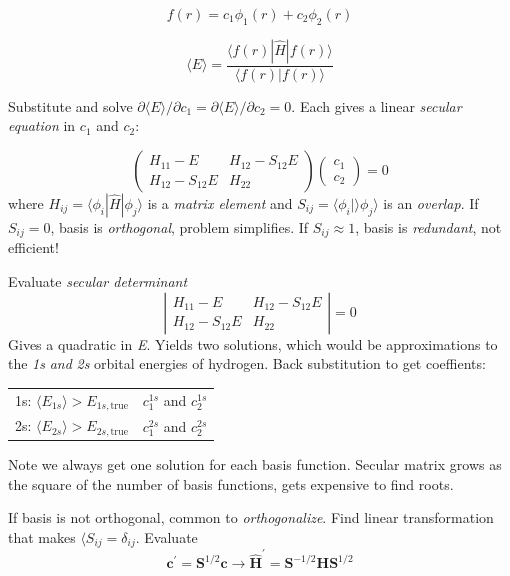 \documentclass[11pt]{article}
\begin{document}
\[f(r) =c_1 \phi_1(r) + c_2\phi_2(r) \]

\[\langle E \rangle = \frac{\langle f(r)|\hat{H}|f(r)\rangle}{\langle f(r)|f(r)\rangle} \]

Substitute and solve \(\partial \langle E \rangle/\partial c_1 = \partial \langle E \rangle/\partial c_2 = 0\).  Each gives a linear \emph{secular equation} in \(c_1\) and \(c_2\):

\[
\left(\begin{array}{cc}
H_{11} - E & H_{12}-S_{12}E \\
H_{12}-S_{12}E & H_{22} 
\end{array}\right)\left(
\begin{array}{c} c_1 \\c_2\end{array}\right) =0
\]
where \(H_{ij} = \langle\phi_i|\hat{H}|\phi_j\rangle\) is a \emph{matrix element} and \(S_{ij}=\langle \phi_i | \rangle \phi_j \rangle\) is an \emph{overlap}.  If \(S_{ij} = 0\), basis is \emph{orthogonal}, problem simplifies.  If \(S_{ij}\approx 1\), basis is \emph{redundant}, not efficient!

Evaluate \emph{secular determinant} 
\[ \left| \begin{array}{cc} H_{11} - E & H_{12}-S_{12}E
\\ H_{12}-S_{12}E & H_{22} \end{array}\right| =0 \]
Gives a quadratic in \emph{E}.  Yields two solutions, which would be approximations to the \emph{1s} \emph{and} \emph{2s} orbital energies of hydrogen. Back substitution to get coeffients:

\begin{center}
\begin{tabular}{ll}
1s: \(\langle E_{1s}\rangle > E_{1s,\mathrm{true}}\) & \(c^{1s}_1\) and \(c^{1s}_2\)\\
2s: \(\langle E_{2s}\rangle > E_{2s,\mathrm{true}}\) & \(c^{2s}_1\) and \(c^{2s}_2\)\\
\end{tabular}
\end{center}

Note we always get one solution for each basis function.  Secular
matrix grows as the square of the number of basis functions, gets
expensive to find roots. 

If basis is not orthogonal, common to \emph{orthogonalize}.  Find linear transformation that makes \(\langle S_{ij} = \delta_{ij}\).  Evaluate
\[ \bm{c}^\prime = \bm{S}^{1/2} \bm{c} \rightarrow \hat{\bm{H}}^\prime = \bm{S}^{-1/2}\bm{H}\bm{S}^{1/2}\]
\end{document}
